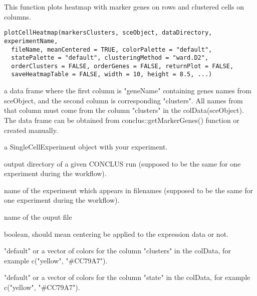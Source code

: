 \documentclass[a4paper]{book}
\begin{document}
%
\begin{Description}\relax
This function plots heatmap with marker genes on rows and clustered cells on columns.
\end{Description}
%
\begin{Usage}
\begin{verbatim}
plotCellHeatmap(markersClusters, sceObject, dataDirectory, experimentName,
  fileName, meanCentered = TRUE, colorPalette = "default",
  statePalette = "default", clusteringMethod = "ward.D2",
  orderClusters = FALSE, orderGenes = FALSE, returnPlot = FALSE,
  saveHeatmapTable = FALSE, width = 10, height = 8.5, ...)
\end{verbatim}
\end{Usage}
%
\begin{Arguments}
\begin{ldescription}
\item[\code{markersClusters}] a data frame where the first column is "geneName" containing genes names from sceObject, 
and the second column is corresponding "clusters". All names from that column must come from the column "clusters" in the colData(sceObject).
The data frame can be obtained from conclus::getMarkerGenes() function or created manually.

\item[\code{sceObject}] a SingleCellExperiment object with your experiment.

\item[\code{dataDirectory}] output directory of a given CONCLUS run (supposed to be the same for one experiment during the workflow).

\item[\code{experimentName}] name of the experiment which appears in filenames (supposed to be the same for one experiment during the workflow).

\item[\code{fileName}] name of the ouput file

\item[\code{meanCentered}] boolean, should mean centering be applied to the expression data or not.

\item[\code{colorPalette}] "default" or a vector of colors for the column "clusters" in the colData, for example c("yellow", "\#CC79A7").

\item[\code{statePalette}] "default" or a vector of colors for the column "state" in the colData, for example c("yellow", "\#CC79A7").


\end{ldescription}
\end{Arguments}
\end{document}
